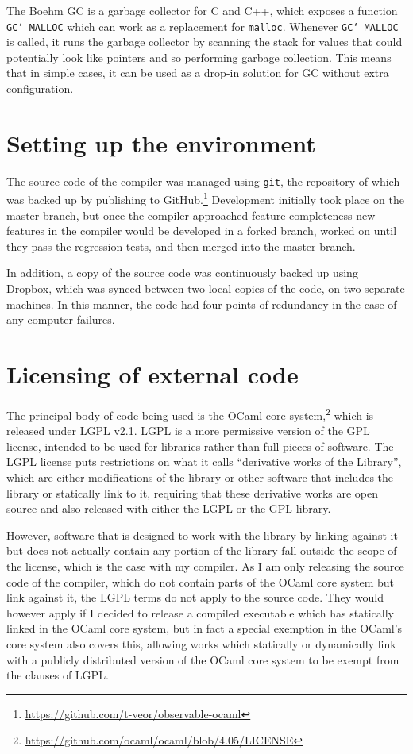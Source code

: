 The Boehm GC is a garbage collector for C and C++, which exposes a function
\texttt{GC\char`_MALLOC} which can work as a replacement for \texttt{malloc}.
Whenever \texttt{GC\char`_MALLOC} is called, it runs the garbage collector by
scanning the stack for values that could potentially look like pointers and so
performing garbage collection. This means that in simple cases, it can be used
as a drop-in solution for GC without extra configuration.

\section{Setting up the environment}

The source code of the compiler was managed using \texttt{git}, the repository
of which was backed up by publishing to
GitHub.\footnote{\url{https://github.com/t-veor/observable-ocaml}} Development
initially took place on the master branch, but once the compiler approached
feature completeness new features in the compiler would be developed in a forked
branch, worked on until they pass the regression tests, and then merged into the
master branch.

In addition, a copy of the source code was continuously backed up using Dropbox,
which was synced between two local copies of the code, on two separate machines.
In this manner, the code had four points of redundancy in the case of any
computer failures.

\section{Licensing of external code}

The principal body of code being used is the OCaml core
system,\footnote{\url{https://github.com/ocaml/ocaml/blob/4.05/LICENSE}} which
is released under LGPL v2.1. LGPL is a more permissive version of the GPL
license, intended to be used for libraries rather than full pieces of software.
The LGPL license puts restrictions on what it calls ``derivative works of the
Library'', which are either modifications of the library or other software that
includes the library or statically link to it, requiring that these derivative
works are open source and also released with either the LGPL or the GPL library.

However, software that is designed to work with the library by linking against
it but does not actually contain any portion of the library fall outside the
scope of the license, which is the case with my compiler. As I am only releasing
the source code of the compiler, which do not contain parts of the OCaml core
system but link against it, the LGPL terms do not apply to the source code. They
would however apply if I decided to release a compiled executable which has
statically linked in the OCaml core system, but in fact a special exemption in
the OCaml's core system also covers this, allowing works which statically or
dynamically link with a publicly distributed version of the OCaml core system
to be exempt from the clauses of LGPL.

